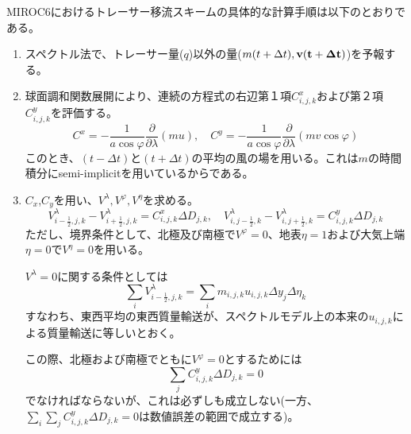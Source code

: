 \documentclass{jsbook}
\begin{document}
MIROC6におけるトレーサー移流スキームの具体的な計算手順は以下のとおりである。
\begin{enumerate}
\item スペクトル法で、トレーサー量($q$)以外の量($m(t+\Delta t), \bf{v}(t+\Delta t)$)を予報する。
\item 球面調和関数展開により、連続の方程式の右辺第１項$C^{x}_{i,j,k}$および第２項$C^{y}_{i,j,k}$を評価する。
  \begin{equation}
    C^{x}=-\frac{1}{a \cos \varphi}\frac{\partial}{\partial \lambda}(mu),\quad C^{y}=-\frac{1}{a \cos \varphi}\frac{\partial}{\partial \lambda}(mv \cos \varphi) 
  \end{equation}
  このとき、$(t-\Delta t)$と$(t+\Delta t)$の平均の風の場を用いる。これは$m$の時間積分にsemi-implicitを用いているからである。
\item $C_{x}$,$C_{y}$を用い、$V^{\lambda}, V^{\varphi}, V^{\eta}$を求める。
  \begin{equation}
    V^{\lambda}_{i-\frac{1}{2},j,k}-V^{\lambda}_{i+\frac{1}{2},j,k}=C^{x}_{i,j,k}\Delta D_{j,k}, \quad V^{\lambda}_{i,j-\frac{1}{2},k}-V^{\lambda}_{i,j+\frac{1}{2},k}=C^{y}_{i,j,k}\Delta D_{j,k}
  \end{equation}
  ただし、境界条件として、北極及び南極で$V^{\varphi}=0$、地表$\eta=1$および大気上端$\eta=0$で$V^{\eta}=0$を用いる。

  $V^{\lambda}=0$に関する条件としては
  \begin{equation}
    \sum_{i}V^{\lambda}_{i-\frac{1}{2},j,k}=\sum_{i}m_{i,j,k}u_{i,j,k}\Delta y_{j}\Delta \eta_{k}
  \end{equation}
  すなわち、東西平均の東西質量輸送が、スペクトルモデル上の本来の$u_{i,j,k}$による質量輸送に等しいとおく。

  この際、北極および南極でともに$V^{\varphi}=0$とするためには
  \begin{equation}
    \sum_{j}C^{y}_{i,j,k}\Delta D_{j,k}=0
  \end{equation}
  でなければならないが、これは必ずしも成立しない(一方、$\sum_{i} \sum_{j}C^{y}_{i,j,k}\Delta D_{j,k}=0$は数値誤差の範囲で成立する)。


\end{enumerate}
\end{document}
